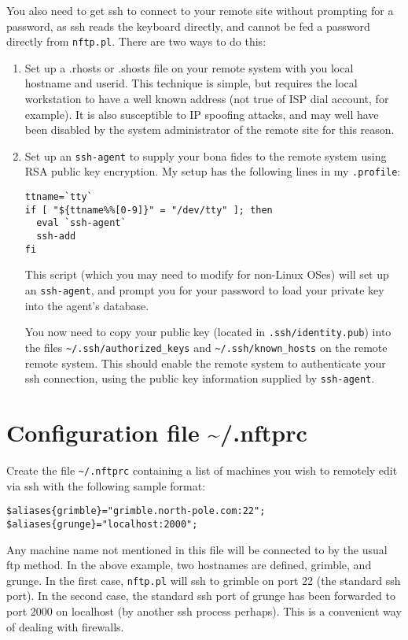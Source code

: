 You also need to get ssh to connect to your remote site without
prompting for a password, as ssh reads the keyboard directly, and
cannot be fed a password directly from {\tt nftp.pl}. There are two
ways to do this:
\begin{enumerate}
\item Set up a .rhosts or .shosts file on your remote system with you
  local hostname and userid. This technique is simple, but requires
  the local workstation to have a well known address (not true of ISP
  dial account, for example). It is also susceptible to IP spoofing
  attacks, and may well have been disabled by the system administrator
  of the remote site for this reason.
\item Set up an {\tt ssh-agent} to supply your bona fides to the
  remote system using RSA public key encryption. My setup has the
  following lines in my {\tt .profile}:
\begin{verbatim}
ttname=`tty`
if [ "${ttname%%[0-9]}" = "/dev/tty" ]; then
  eval `ssh-agent`
  ssh-add
fi
\end{verbatim}
This script (which you may need to modify for non-Linux OSes) will set
up an {\tt ssh-agent}, and prompt you for your password to load your
private key into the agent's database.

You now need to copy your public key (located in
\verb+.ssh/identity.pub+) into the files \verb+~/.ssh/authorized_keys+
and \verb+~/.ssh/known_hosts+ on the remote remote system. This should
enable the remote system to authenticate your ssh connection, using
the public key information supplied by {\tt ssh-agent}.
\end{enumerate}

\section{Configuration file \~{}/.nftprc}

Create the file \verb+~/.nftprc+ containing a list of machines you
wish to remotely edit via ssh with the following sample format:
\begin{verbatim}
$aliases{grimble}="grimble.north-pole.com:22";
$aliases{grunge}="localhost:2000";
\end{verbatim}
Any machine name not mentioned in this file will be connected to by
the usual ftp method. In the above example, two hostnames are defined,
grimble, and grunge. In the first case, {\tt nftp.pl} will ssh to grimble
on port 22 (the standard ssh port). In the second case, the standard
ssh port of grunge has been forwarded to port 2000 on localhost (by another ssh
process perhaps). This is a convenient way of dealing with firewalls.


